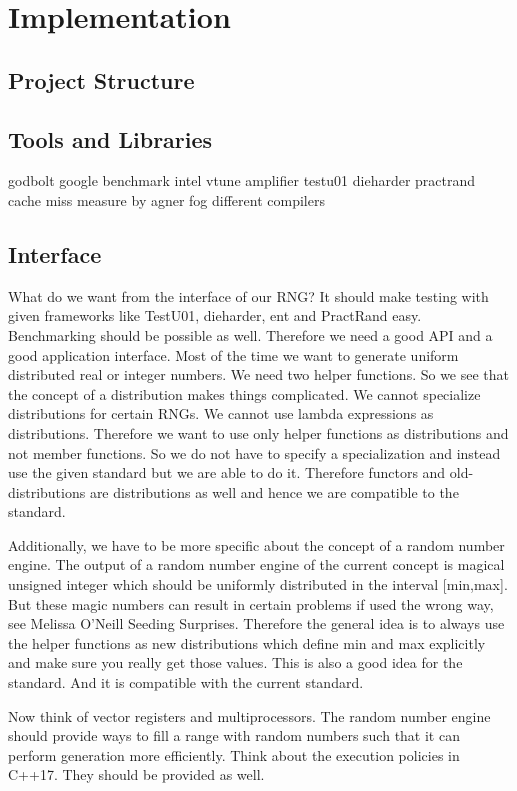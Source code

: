 \documentclass[crop=false]{standalone}
\begin{document}
  \section{Implementation} %
  \label{sec:implementation}
    \subsection{Project Structure} %
    \label{sub:project_structure}

    \subsection{Tools and Libraries} %
    \label{sub:tools_and_libraries}
      godbolt
      google benchmark
      intel vtune amplifier
      testu01
      dieharder
      practrand
      cache miss measure by agner fog
      different compilers

    \subsection{Interface} %
    \label{sub:interface}
      What do we want from the interface of our RNG?
      It should make testing with given frameworks like TestU01, dieharder, ent and PractRand easy.
      Benchmarking should be possible as well.
      Therefore we need a good API and a good application interface.
      Most of the time we want to generate uniform distributed real or integer numbers.
      We need two helper functions.
      So we see that the concept of a distribution makes things complicated.
      We cannot specialize distributions for certain RNGs.
      We cannot use lambda expressions as distributions.
      Therefore we want to use only helper functions as distributions and not member functions.
      So we do not have to specify a specialization and instead use the given standard but we are able to do it.
      Therefore functors and old-distributions are distributions as well and hence we are compatible to the standard.

      Additionally, we have to be more specific about the concept of a random number engine.
      The output of a random number engine of the current concept is magical unsigned integer which should be uniformly distributed in the interval [min,max].
      But these magic numbers can result in certain problems if used the wrong way, see Melissa O'Neill Seeding Surprises.
      Therefore the general idea is to always use the helper functions as new distributions which define min and max explicitly and make sure you really get those values.
      This is also a good idea for the standard.
      And it is compatible with the current standard.

      Now think of vector registers and multiprocessors.
      The random number engine should provide ways to fill a range with random numbers such that it can perform generation more efficiently.
      Think about the execution policies in C++17.
      They should be provided as well.
\end{document}

